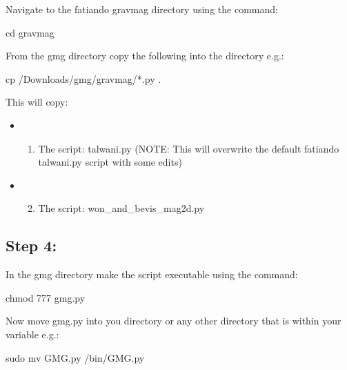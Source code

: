 \documentclass[a4paper,10pt,english]{sphinxmanual}
\begin{document}
Navigate to the fatiando gravmag directory using the command:

%
\begin{sphinxVerbatim}[commandchars=\\\{\}]
cd gravmag
\end{sphinxVerbatim}

From the gmg directory  copy the following into the  directory e.g.:

%
\begin{sphinxVerbatim}[commandchars=\\\{\}]
cp \PYGZti{}/Downloads/gmg/gravmag/*.py .
\end{sphinxVerbatim}

This will copy:
\begin{itemize}
\item {} \begin{enumerate}
\item {} 
The script: talwani.py (NOTE: This will overwrite the default fatiando talwani.py script with some edits)

\end{enumerate}

\item {} \begin{enumerate}
\setcounter{enumi}{1}
\item {} 
The script: won\_and\_bevis\_mag2d.py

\end{enumerate}

\end{itemize}


\subsection{Step 4:}
\label{\detokenize{installation:step-4}}
In the gmg directory make the  script executable using the command:

%
\begin{sphinxVerbatim}[commandchars=\\\{\}]
chmod 777 gmg.py
\end{sphinxVerbatim}

Now move gmg.py into you  directory or any other directory that is within your  variable e.g.:

%
\begin{sphinxVerbatim}[commandchars=\\\{\}]
sudo mv GMG.py /bin/GMG.py
\end{sphinxVerbatim}
\end{document}
